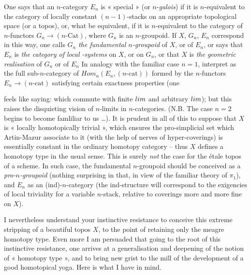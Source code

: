 \documentclass[11pt,a4paper]{article}
\begin{document}
One says that an $n$-category $E_n$ is « special » (or $n$-\emph{galois}) if it is $n$-equivalent to the category of locally constant $(n-1)$-stacks on an appropriate topological space (or a topos), or, what   be equivalent, if it is $n$-equivalent to the category of $n$-functors $G_n \to (n\text{-}\mathrm{Cat})$, where $G_n$ is an $n$-groupoid. If $X$, $G_n$, $E_n$ correspond in this way, one calls $G_n$ \emph{the fundamental $n$-groupoid} of $X$, or of $E_n$, or says that $E_n$ is \emph{the category of local} \emph{-systems} on $X$, or on $G_n$, or that $X$ is \emph{the geometric realisation} of $G_n$ or of $E_n$ In analogy with the familiar case $n = 1$,   interpret  as the full sub-$n$-category of $\mathit{Hom}_n(E_n, (n\text{-}\mathrm{cat}))$ formed by the $n$-functors $E_n \to (n\text{-}\mathrm{cat})$ satisfying certain exactness properties (one

feels like saying: which commute with finite $\varprojlim$ and arbitrary $\varinjlim$); but this raises the disquieting vision of $n$-limits in $n$-categories. (N.B. The case $n = 2$ begins to become famliliar to us …). It is prudent in all of this to suppose that $X$ is « locally homotopically trivial », which ensures the pro-simplicial set which Artin-Mazur associate to it (with the help of nerves of hyper-coverings) is essentially constant in the ordinary homotopy category -- thus $X$ defines a homotopy type in the usual sense. This is surely \emph{not} the case for the étale topos of a scheme. In such case, the fundamental $n$-groupoid should be conceived as a \emph{pro-$n$-groupoid} (nothing surprising in that, in view of the familiar theory of $\pi_1$), and $E_n$ as an (ind)-$n$-category (the ind-structure will correspond to the exigencies of local triviality for a variable $n$-stack, relative to coverings more and more fine on $X$).

I nevertheless understand your instinctive resistance to conceive this extreme stripping of a beautiful topos $X$, to the point of retaining only the meagre homotopy type. Even more\add{,} I am persuaded that going to the root of this instinctive resistance, one arrives at a generalisation and deepening of the notion of « homotopy type », and to bring new grist to the mill of the development of a good homotopical yoga. Here is what I have in mind.
\end{document}
